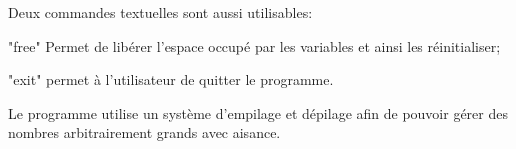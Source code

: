 \documentclass[]{report}
\begin{document}
\begin{normalsize}
		\vspace{4mm}
		\par Deux commandes textuelles sont aussi utilisables:
		\begin{description}[noitemsep]
			\item \hspace{4mm}"free" Permet de libérer l'espace occupé par les variables et ainsi les réinitialiser;
			\item \hspace{4mm}"exit" permet à l'utilisateur de quitter le programme.
		\end{description}
	\par Le programme utilise un système d'empilage et dépilage afin de pouvoir gérer des nombres arbitrairement grands avec aisance.
		\vspace{4mm}
		\newpage
	\end{normalsize}
\end{document}
